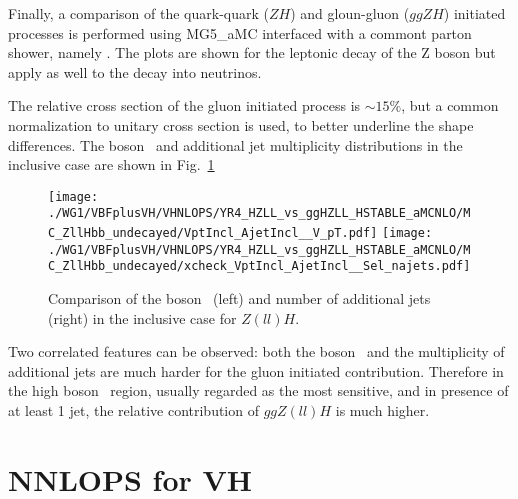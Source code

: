 Finally, a comparison of the quark-quark ($ZH$) and gloun-gluon ($ggZH$) initiated processes is performed using
{\sc MG5\_aMC} interfaced with a commont parton shower, namely . The plots are shown for the leptonic decay of the Z boson
but apply as well to the decay into neutrinos.

The relative cross section of the gluon initiated process is $\sim15\%$, but a common normalization to unitary cross section is used,
to better underline the shape differences.
The boson \pt\ and additional jet multiplicity distributions in the inclusive case are shown in Fig.~\ref{fig:stable__incl_vpt_jets_ggzh}
\begin{figure}[hptb]
\centering
\texttt{[image: ./WG1/VBFplusVH/VHNLOPS/YR4\_HZLL\_vs\_ggHZLL\_HSTABLE\_aMCNLO/MC\_ZllHbb\_undecayed/VptIncl\_AjetIncl\_\_V\_pT.pdf]}
\texttt{[image: ./WG1/VBFplusVH/VHNLOPS/YR4\_HZLL\_vs\_ggHZLL\_HSTABLE\_aMCNLO/MC\_ZllHbb\_undecayed/xcheck\_VptIncl\_AjetIncl\_\_Sel\_najets.pdf]}
\caption{Comparison of the boson \pt\ (left) and number of additional jets (right) in the inclusive case for $Z(ll)H$.}
\label{fig:stable__incl_vpt_jets_ggzh}
\end{figure}
Two correlated features can be observed: both the boson \pt\ and the multiplicity of additional jets are much harder for the gluon initiated contribution.
Therefore in the high boson \pt\ region, usually regarded as the most sensitive, and in presence of at least 1 jet, the relative contribution of $ggZ(ll)H$
is much higher.

\clearpage
\section{NNLOPS for VH}


